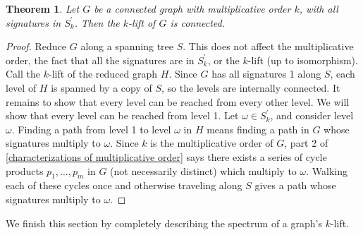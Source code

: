 \documentclass[12pt]{article}
\newtheorem{thm}{Theorem}
\theoremstyle{definition}
\begin{document}
\begin{thm}
Let $G$ be a connected graph with multiplicative order $k$, with all signatures in $S^\prime_k$. Then the $k$-lift of $G$ is connected.
\end{thm}
\begin{proof}
Reduce $G$ along a spanning tree $S$. This does not affect the multiplicative order, the fact that all the signatures are in $S^\prime_k$, or the $k$-lift (up to isomorphism). Call the $k$-lift of the reduced graph $H$. Since $G$ has all signatures 1 along $S$, each level of $H$ is spanned by a copy of $S$, so the levels are internally connected. It remains to show that every level can be reached from every other level. We will show that every level can be reached from level 1. Let $\omega \in S^\prime_k$, and consider level $\omega$. Finding a path from level 1 to level $\omega$ in $H$ means finding a path in $G$ whose signatures multiply to $\omega$. Since $k$ is the multiplicative order of $G$, part 2 of \cref{characterizations of multiplicative order} says there exists a series of cycle products $p_1, \dots, p_m$ in $G$ (not necessarily distinct) which multiply to $\omega$. Walking each of these cycles once and otherwise traveling along $S$ gives a path whose signatures multiply to $\omega$. 
\end{proof}

We finish this section by completely describing the spectrum of a graph's $k$-lift.
\end{document}
